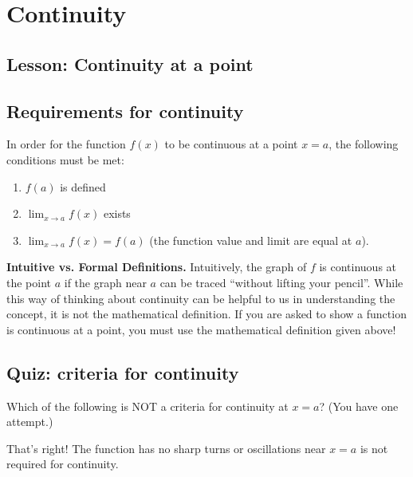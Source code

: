 \documentclass{ximera}
\begin{document}
\section{Continuity}

\subsection{Lesson: Continuity at a point}

\begin{center}
\end{center}

\subsection{Requirements for continuity}

In order for the function $f(x)$ to be continuous at a point $x=a$, the following conditions must be met:
\begin{enumerate}
    \item $f(a)$ is defined
    \item $\lim_{x \to a} f(x)$ exists
    \item $\lim_{x \to a} f(x) = f(a)$ (the function value and limit are equal at $a$).
\end{enumerate}

\begin{explanation}
    \begin{foldable}
        \textbf{Intuitive vs. Formal Definitions.} Intuitively, the graph of $f$ is continuous at the point $a$ if the graph near $a$ can be traced ``without lifting your pencil''. While this way of thinking about continuity can be helpful to us in understanding the concept, it is not the mathematical definition. If you are asked to show a function is continuous at a point, you must use the mathematical definition given above!
    \end{foldable}
\end{explanation}

\subsection{Quiz: criteria for continuity}

\begin{question}
Which of the following is NOT a criteria for continuity at $x=a$? (You have one attempt.)
\begin{multipleChoice}  
\end{multipleChoice} 

\begin{explanation}
     That's right! The function has no sharp turns or oscillations near $x=a$ is not required for continuity.
 \end{explanation} 
\end{question}
\end{document}
